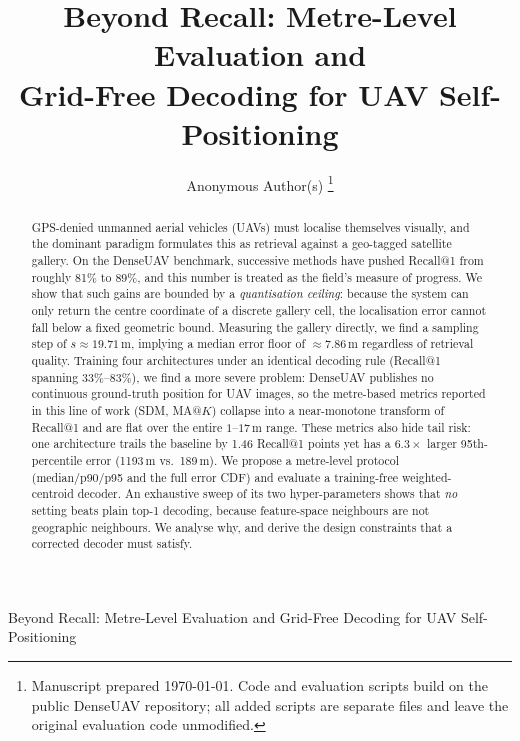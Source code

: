 \documentclass[journal]{IEEEtran}
\begin{document}
\title{Beyond Recall: Metre-Level Evaluation and\\
Grid-Free Decoding for UAV Self-Positioning}

\author{Anonymous Author(s)%
\thanks{Manuscript prepared \today. Code and evaluation scripts build on the public
DenseUAV repository; all added scripts are separate files and leave the original
evaluation code unmodified.}}

%
{Beyond Recall: Metre-Level Evaluation and Grid-Free Decoding for UAV Self-Positioning}

\maketitle

\begin{abstract}
GPS-denied unmanned aerial vehicles (UAVs) must localise themselves visually, and the
dominant paradigm formulates this as retrieval against a geo-tagged satellite gallery.
On the DenseUAV benchmark, successive methods have pushed Recall@1 from roughly 81\% to
89\%, and this number is treated as the field's measure of progress. We show that such
gains are bounded by a \emph{quantisation ceiling}: because the system can only return
the centre coordinate of a discrete gallery cell, the localisation error cannot fall
below a fixed geometric bound. Measuring the gallery directly, we find a sampling step
of $s \approx 19.71$\,m, implying a median error floor of $\approx 7.86$\,m regardless
of retrieval quality. Training four architectures under an identical decoding rule
(Recall@1 spanning 33\%--83\%), we find a more severe problem: DenseUAV publishes no
continuous ground-truth position for UAV images, so the metre-based metrics reported in
this line of work (SDM, MA@$K$) collapse into a near-monotone transform of Recall@1 and
are flat over the entire $1$--$17$\,m range. These metrics also hide tail risk: one
architecture trails the baseline by 1.46 Recall@1 points yet has a $6.3\times$ larger
95th-percentile error (1193\,m vs.\ 189\,m). We propose a metre-level protocol
(median/p90/p95 and the full error CDF) and evaluate a training-free weighted-centroid
decoder. An exhaustive sweep of its two hyper-parameters shows that \emph{no} setting
beats plain top-1 decoding, because feature-space neighbours are not geographic
neighbours. We analyse why, and derive the design constraints that a corrected decoder
must satisfy.
\end{abstract}
\end{document}
